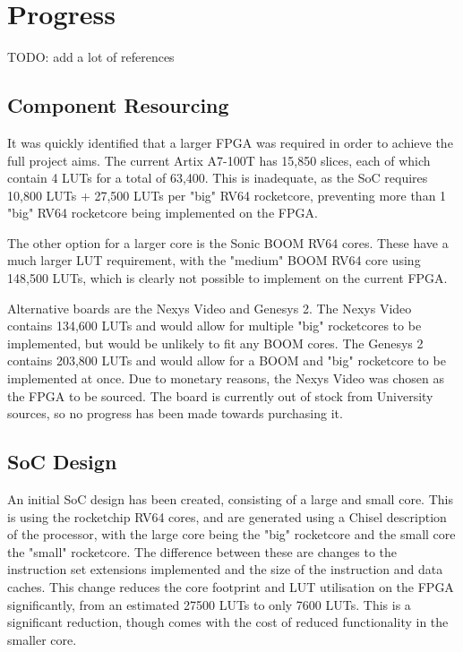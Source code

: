 \section{Progress}
TODO: add a lot of references
\label{sec:progress}
\subsection{Component Resourcing}
It was quickly identified that a larger FPGA was required in order to achieve the full project aims. The current Artix A7-100T \cite{} has 15,850 slices, each of which contain 4 LUTs for a total of 63,400. This is inadequate, as the SoC requires 10,800 LUTs + 27,500 LUTs per "big" RV64 rocketcore, preventing more than 1 "big" RV64 rocketcore being implemented on the FPGA.

The other option for a larger core is the Sonic BOOM RV64 cores. These have a much larger LUT requirement, with the "medium" BOOM RV64 core using 148,500 LUTs, which is clearly not possible to implement on the current FPGA.

Alternative boards are the Nexys Video and Genesys 2. The Nexys Video contains 134,600 LUTs and would allow for multiple "big" rocketcores to be implemented, but would be unlikely to fit any BOOM cores. The Genesys 2 contains 203,800 LUTs and would allow for a BOOM and "big" rocketcore to be implemented at once. Due to monetary reasons, the Nexys Video was chosen as the FPGA to be sourced. The board is currently out of stock from University sources, so no progress has been made towards purchasing it.

\subsection{SoC Design}
An initial SoC design has been created, consisting of a large and small core. This is using the rocketchip\cite{rocketchip} RV64 cores, and are generated using a Chisel description of the processor, with the large core being the "big" rocketcore and the small core the "small" rocketcore. The difference between these are changes to the instruction set extensions implemented and the size of the instruction and data caches. This change reduces the core footprint and LUT utilisation on the FPGA significantly, from an estimated 27500 LUTs to only 7600 LUTs. This is a significant reduction, though comes with the cost of reduced functionality in the smaller core.

